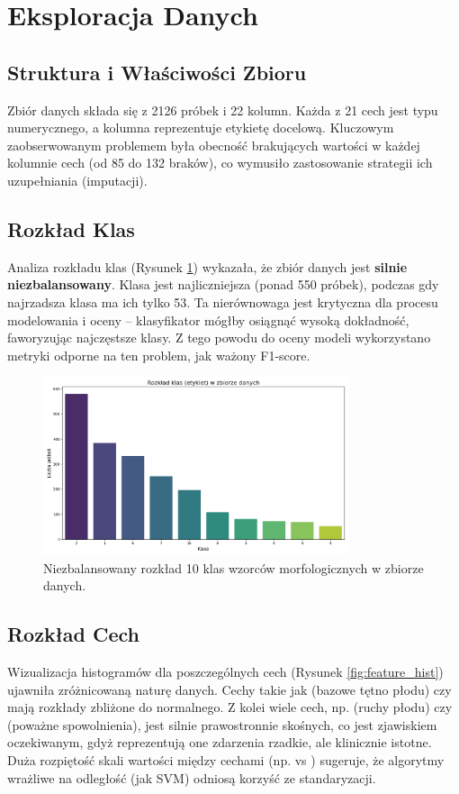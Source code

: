 \documentclass[12pt,a4paper]{article}
\newcommand{\code}[1]{\texttt{\detokenize{#1}}}
\begin{document}
\section{Eksploracja Danych}
\subsection{Struktura i Właściwości Zbioru}
Zbiór danych składa się z 2126 próbek i 22 kolumn. Każda z 21 cech jest typu numerycznego, a kolumna \code{CLASS} reprezentuje etykietę docelową. Kluczowym zaobserwowanym problemem była obecność brakujących wartości w każdej kolumnie cech (od 85 do 132 braków), co wymusiło zastosowanie strategii ich uzupełniania (imputacji).

\subsection{Rozkład Klas}
Analiza rozkładu klas (Rysunek \ref{fig:class_dist}) wykazała, że zbiór danych jest \textbf{silnie niezbalansowany}. Klasa \code{2} jest najliczniejsza (ponad 550 próbek), podczas gdy najrzadsza klasa \code{3} ma ich tylko 53. Ta nierównowaga jest krytyczna dla procesu modelowania i oceny – klasyfikator mógłby osiągnąć wysoką dokładność, faworyzując najczęstsze klasy. Z tego powodu do oceny modeli wykorzystano metryki odporne na ten problem, jak ważony F1-score.

\begin{figure}[H]
    \centering
    \includegraphics[width=0.8\textwidth]{output/class_distribution.png}
    \caption{Niezbalansowany rozkład 10 klas wzorców morfologicznych w zbiorze danych.}
    \label{fig:class_dist}
\end{figure}

\subsection{Rozkład Cech}
Wizualizacja histogramów dla poszczególnych cech (Rysunek \ref{fig:feature_hist}) ujawniła zróżnicowaną naturę danych. Cechy takie jak \code{LB} (bazowe tętno płodu) czy \code{Mode} mają rozkłady zbliżone do normalnego. Z kolei wiele cech, np. \code{FM} (ruchy płodu) czy \code{DS} (poważne spowolnienia), jest silnie prawostronnie skośnych, co jest zjawiskiem oczekiwanym, gdyż reprezentują one zdarzenia rzadkie, ale klinicznie istotne. Duża rozpiętość skali wartości między cechami (np. \code{AC} vs \code{Width}) sugeruje, że algorytmy wrażliwe na odległość (jak SVM) odniosą korzyść ze standaryzacji.
\end{document}
